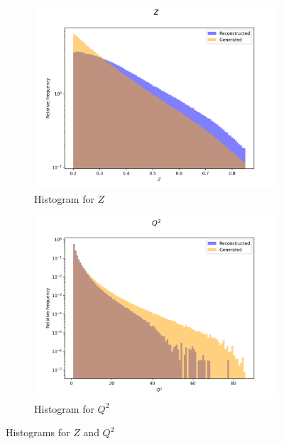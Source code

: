 \documentclass{article}
\begin{document}
\begin{figure}[H]
    \centering
    \begin{subfigure}[b]{0.45\textwidth}
        \includegraphics[width=\textwidth]{graphs/hadr_Z.png}
        \caption{Histogram for $Z$}
        \label{fig:had_Z}
    \end{subfigure}
    \hfill
    \begin{subfigure}[b]{0.45\textwidth}
        \includegraphics[width=\textwidth]{graphs/hadr_Q2.png}
        \caption{Histogram for $Q^2$}
        \label{fig:had_Q2}
    \end{subfigure}
    \caption{Histograms for $Z$ and $Q^2$}
\end{figure}
\end{document}
